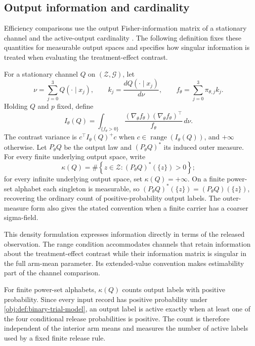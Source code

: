 \subsection{Output information and cardinality}

Efficiency comparisons use the output Fisher-information matrix  of a stationary channel and the active-output cardinality . The following definition fixes these quantities for measurable output spaces and specifies how singular information is treated when evaluating the treatment-effect contrast.

For a stationary channel \(Q\) on \((\mathcal Z,\mathcal G)\), let
\[
\nu=\sum_{j=0}^3 Q(\mathord\cdot\mid x_j),
\qquad
k_j=\frac{dQ(\mathord\cdot\mid x_j)}{d\nu},
\qquad
f_\theta=\sum_{j=0}^3\pi_{\theta,j}k_j.
\]
Holding \(Q\) and \(p\) fixed, define
\[
I_\theta(Q)
=
\int_{\{f_\theta>0\}}
\frac{(\nabla_\theta f_\theta)(\nabla_\theta f_\theta)^\top}{f_\theta}\,d\nu.
\]
The contrast variance is \(c^\top I_\theta(Q)^+c\) when
\(c\in\operatorname{range}(I_\theta(Q))\), and \(+\infty\) otherwise. Let \(P_\theta Q\) be the output law and \((P_\theta Q)^*\) its induced outer measure. For every finite underlying output space, write
\[
\kappa(Q)
=
\#\left\{z\in\mathcal Z:
 (P_\theta Q)^*(\{z\})>0\right\};
\]
for every infinite underlying output space, set \(\kappa(Q)=+\infty\). On a finite power-set alphabet each singleton is measurable, so \((P_\theta Q)^*(\{z\})=(P_\theta Q)(\{z\})\), recovering the ordinary count of positive-probability output labels. The outer-measure form also gives the stated convention when a finite carrier has a coarser sigma-field.

This density formulation expresses information directly in terms of the released observation. The range condition accommodates channels that retain information about the treatment-effect contrast while their information matrix is singular in the full arm-mean parameter. Its extended-value convention makes estimability part of the channel comparison.

For finite power-set alphabets, \(\kappa(Q)\) counts output labels with positive probability. Since every input record has positive probability under \cref{obj:def:binary-trial-model}, an output label is active exactly when at least one of the four conditional release probabilities is positive. The count is therefore independent of the interior arm means and measures the number of active labels used by a fixed finite release rule.
